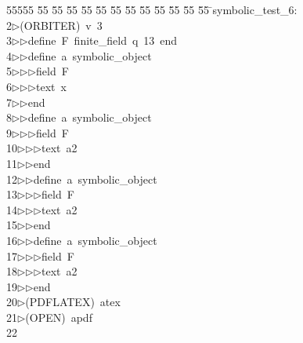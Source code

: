 %
%
\begin{tabbing}
55555 \= 55 \= 55 \= 55 \= 55 \= 55 \= 55 \= 55 \= 55 \= 55 \= 55 \= 55 \= 55 \= \>symbolic\_test\_6:\\[0pt]
2\>$\triangleright$\>(ORBITER)\ v\ 3\ \\[0pt]
3\>$\triangleright$\>$\triangleright$\>define\ F\ finite\_field\ q\ 13\ end\ \\[0pt]
4\>$\triangleright$\>$\triangleright$\>define\ a\ symbolic\_object\ \\[0pt]
5\>$\triangleright$\>$\triangleright$\>$\triangleright$\>field\ F\ \\[0pt]
6\>$\triangleright$\>$\triangleright$\>$\triangleright$\>text\ x\ \\[0pt]
7\>$\triangleright$\>$\triangleright$\>end\ \\[0pt]
8\>$\triangleright$\>$\triangleright$\>define\ a\ symbolic\_object\ \\[0pt]
9\>$\triangleright$\>$\triangleright$\>$\triangleright$\>field\ F\ \\[0pt]
10\>$\triangleright$\>$\triangleright$\>$\triangleright$\>text\ a2\ \\[0pt]
11\>$\triangleright$\>$\triangleright$\>end\ \\[0pt]
12\>$\triangleright$\>$\triangleright$\>define\ a\ symbolic\_object\ \\[0pt]
13\>$\triangleright$\>$\triangleright$\>$\triangleright$\>field\ F\ \\[0pt]
14\>$\triangleright$\>$\triangleright$\>$\triangleright$\>text\ a2\ \\[0pt]
15\>$\triangleright$\>$\triangleright$\>end\ \\[0pt]
16\>$\triangleright$\>$\triangleright$\>define\ a\ symbolic\_object\ \\[0pt]
17\>$\triangleright$\>$\triangleright$\>$\triangleright$\>field\ F\ \\[0pt]
18\>$\triangleright$\>$\triangleright$\>$\triangleright$\>text\ a2\ \\[0pt]
19\>$\triangleright$\>$\triangleright$\>end\\[0pt]
20\>$\triangleright$\>(PDFLATEX)\ atex\\[0pt]
21\>$\triangleright$\>(OPEN)\ apdf\\[0pt]
22\>\end{tabbing}
